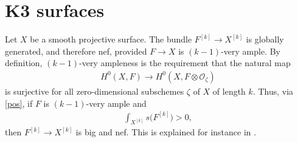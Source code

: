\section[K3 surfaces]{$\boldsymbol{K3}$ surfaces} \label{seck3} Let $X$ be a smooth projective surface. The bundle $F^{[k]}\to X^{[k]}$ is globally generated, and therefore nef, provided $F\to X$ is $(k-1)$-very ample. By definition, $(k-1)$-very ampleness is the requirement that the natural map
\begin{gather*}
H^0(X, F)\to H^0(X, F\otimes \mathcal O_{\zeta})
\end{gather*}
is surjective for all zero-dimensional subschemes $\zeta$ of $X$ of length $k$. Thus, via \eqref{pos}, if $F$ is $(k-1)$-very ample and
\begin{gather*}
\int_{X^{[k]}} s\big(F^{[k]}\big)>0,
\end{gather*}
then $F^{[k]}\to X^{[k]}$ is big and nef. This is explained for instance in \cite[Propositions~2.4 and~4.5]{BBF}.
